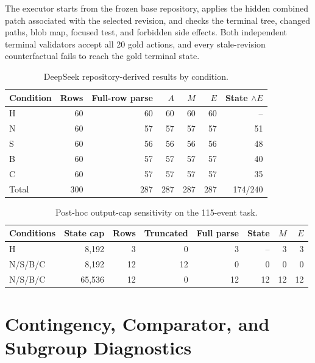 \documentclass[11pt]{article}
\newcommand{\Maction}{M}
\newcommand{\Eoutcome}{E}
\begin{document}
The executor starts from the frozen base repository, applies the hidden combined patch associated with the selected revision, and checks the terminal tree, changed paths, blob map, focused test, and forbidden side effects. Both independent terminal validators accept all 20 gold actions, and every stale-revision counterfactual fails to reach the gold terminal state.

\begin{table}[h]
\centering
\caption{DeepSeek repository-derived results by condition.}
\label{tab:repo_results}
\small
\begin{tabular}{@{}lrrrrrr@{}}
\toprule
Condition & Rows & Full-row parse & \(A\) & \(\Maction\) & \(\Eoutcome\) & State \(\wedge E\) \\
\midrule
H & 60 & 60 & 60 & 60 & 60 & -- \\
N & 60 & 57 & 57 & 57 & 57 & 51 \\
S & 60 & 56 & 56 & 56 & 56 & 48 \\
B & 60 & 57 & 57 & 57 & 57 & 40 \\
C & 60 & 57 & 57 & 57 & 57 & 35 \\
\midrule
Total & 300 & 287 & 287 & 287 & 287 & 174/240 \\
\bottomrule
\end{tabular}
\end{table}

\begin{table}[h]
\centering
\caption{Post-hoc output-cap sensitivity on the 115-event task.}
\label{tab:capacity}
\small
\begin{tabular}{@{}lrrrrrrr@{}}
\toprule
Conditions & State cap & Rows & Truncated & Full parse & State & \(\Maction\) & \(\Eoutcome\) \\
\midrule
H & 8,192 & 3 & 0 & 3 & -- & 3 & 3 \\
N/S/B/C & 8,192 & 12 & 12 & 0 & 0 & 0 & 0 \\
N/S/B/C & 65,536 & 12 & 0 & 12 & 12 & 12 & 12 \\
\bottomrule
\end{tabular}
\end{table}

\section{Contingency, Comparator, and Subgroup Diagnostics}
\label{app:diagnostics}
\end{document}

